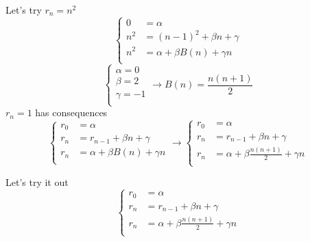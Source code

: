 \documentclass[mode=geye]{elegantnote}
\begin{document}
Let's try $ r_n = n^2 $ 
\begin{equation*}
    \left\{
        \begin{array}{ll}
            0 &= \alpha \\
            n^2 &= (n-1)^2+\beta n+\gamma \\
            n^2 &= \alpha + \beta B(n) + \gamma n \\
        \end{array}
    \right.
\end{equation*}
\begin{equation*}
    \left\{
        \begin{array}{l}
            \alpha = 0\\
            \beta = 2\\
            \gamma = -1\\
        \end{array}
    \right.
    \rightarrow B(n) = \frac{n(n+1)}{2}
\end{equation*}
$ r_n=1 $ has consequences
\begin{equation*}
    \left\{
        \begin{array}{ll}
            r_0 &= \alpha\\
            r_n &= r_{n-1}+\beta n+\gamma\\
            r_n &= \alpha + \beta B(n) + \gamma n\\
        \end{array}
    \right.
    \rightarrow
    \left\{
        \begin{array}{ll}
            r_0 &= \alpha\\
            r_n &= r_{n-1}+\beta n+\gamma\\
            r_n &= \alpha + \beta \frac{n(n+1)}{2} + \gamma n\\
        \end{array}
    \right.
\end{equation*}

Let's try it out
\begin{equation*}
    \left\{
        \begin{array}{ll}
            r_0 &= \alpha\\
            r_n &= r_{n-1}+\beta n+\gamma\\
            r_n &= \alpha + \beta \frac{n(n+1)}{2} + \gamma n\\
        \end{array}
    \right.
\end{equation*}
\end{document}
